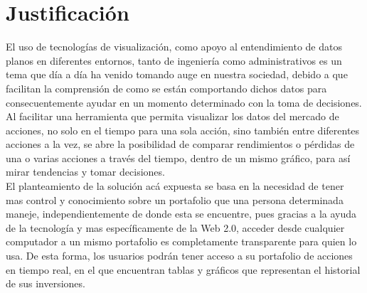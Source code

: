 \chapter{Justificación}
El uso de tecnologías de visualización, como apoyo al entendimiento de datos planos en diferentes entornos, tanto de ingeniería como administrativos es un tema que día a día ha venido tomando auge en nuestra sociedad, debido a que facilitan la comprensión de como se están comportando dichos datos para consecuentemente ayudar en un momento determinado con la toma de decisiones.\\

Al facilitar una herramienta que permita visualizar los datos del mercado de acciones, no solo en el tiempo para una sola acción, sino también entre diferentes acciones a la vez, se abre la posibilidad de comparar rendimientos o pérdidas de una o varias acciones a través del tiempo, dentro de un mismo gráfico, para así mirar tendencias y tomar decisiones.\\

El planteamiento de la solución acá expuesta se basa en la necesidad de tener mas control y conocimiento sobre un portafolio que una persona determinada maneje, independientemente de donde esta se encuentre, pues gracias a la ayuda de la tecnología y mas específicamente de la Web 2.0, acceder desde cualquier computador a un mismo portafolio es completamente transparente para quien lo usa. De esta forma, los usuarios podrán tener acceso a su portafolio de acciones en tiempo real, en el que encuentran tablas y gráficos que representan el historial de sus inversiones. 

